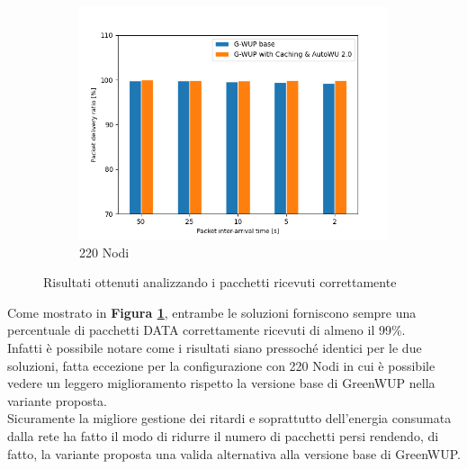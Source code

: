 \begin{figure}[h!]
\begin{subfigure}[t]{0.329\linewidth}
    \includegraphics[width=1.13\linewidth]{Contents/Images/graphs/analisi_final2.0/pdr/pdr_220.png}
    \caption{220 Nodi}
  \end{subfigure}
  \caption{Risultati ottenuti analizzando i pacchetti ricevuti correttamente}
  \label{fig:analisi_pdr}
\end{figure}

Come mostrato in \textbf{Figura \ref{fig:analisi_pdr}}, entrambe le soluzioni forniscono sempre una percentuale di pacchetti DATA correttamente ricevuti di almeno il 99\%.\\
Infatti è possibile notare come i risultati siano pressoché identici per le due soluzioni, fatta eccezione per la configurazione con 220 Nodi in cui è possibile vedere un leggero miglioramento rispetto la versione base di GreenWUP nella variante proposta.\\
Sicuramente la migliore gestione dei ritardi e soprattutto dell'energia consumata dalla rete ha fatto il modo di ridurre il numero di pacchetti persi rendendo, di fatto, la variante proposta una valida alternativa alla versione base di GreenWUP.